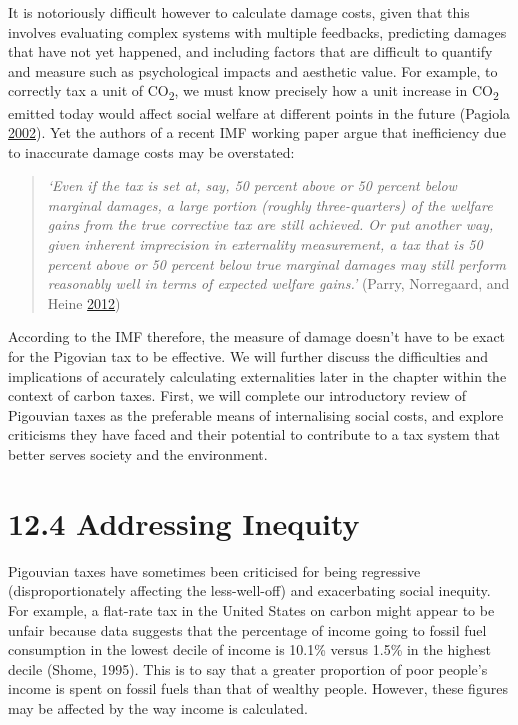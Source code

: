 \documentclass[]{tufte-handout}
\begin{document}
It is notoriously difficult however to calculate damage costs, given
that this involves evaluating complex systems with multiple feedbacks,
predicting damages that have not yet happened, and including factors
that are difficult to quantify and measure such as psychological impacts
and aesthetic value. For example, to correctly tax a unit of
CO\textsubscript{2}, we must know precisely how a unit increase in
CO\textsubscript{2} emitted today would affect social welfare at
different points in the future (Pagiola
\protect\hyperlink{ref-Pagiola2002}{2002}). Yet the authors of a recent
IMF working paper argue that inefficiency due to inaccurate damage costs
may be overstated:

\begin{quote}
\emph{`Even if the tax is set at, say, 50 percent above or 50 percent
below marginal damages, a large portion (roughly three-quarters) of the
welfare gains from the true corrective tax are still achieved. Or put
another way, given inherent imprecision in externality measurement, a
tax that is 50 percent above or 50 percent below true marginal damages
may still perform reasonably well in terms of expected welfare gains.'}
(Parry, Norregaard, and Heine \protect\hyperlink{ref-Parry2012}{2012})
\end{quote}

According to the IMF therefore, the measure of damage doesn't have to be
exact for the Pigovian tax to be effective. We will further discuss the
difficulties and implications of accurately calculating externalities
later in the chapter within the context of carbon taxes. First, we will
complete our introductory review of Pigouvian taxes as the preferable
means of internalising social costs, and explore criticisms they have
faced and their potential to contribute to a tax system that better
serves society and the environment.

\hypertarget{addressing-inequity}{%
\section{12.4 Addressing Inequity}\label{addressing-inequity}}

Pigouvian taxes have sometimes been criticised for being regressive
(disproportionately affecting the less-well-off) and exacerbating social
inequity. For example, a flat-rate tax in the United States on carbon
might appear to be unfair because data suggests that the percentage of
income going to fossil fuel consumption in the lowest decile of income
is 10.1\% versus 1.5\% in the highest decile (Shome, 1995). This is to
say that a greater proportion of poor people's income is spent on fossil
fuels than that of wealthy people. However, these figures may be
affected by the way income is calculated.
\end{document}
